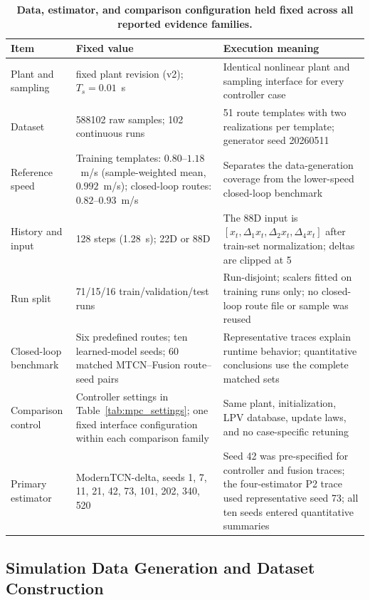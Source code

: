 \documentclass{ieeeaccess}
\begin{document}
\begin{table}[!t]
\centering
\caption{\textbf{Data, estimator, and comparison configuration held fixed across all reported evidence families.}}
\label{tab:frozen_experimental_configuration}
\scriptsize
\setlength{\tabcolsep}{3.4pt}
\setlength{\tabcolsep}{3pt}
\begin{tabular}{|p{}|p{}|p{}|}
\hline
Item & Fixed value & Execution meaning \\
\hline
Plant and sampling & fixed plant revision (v2); $T_s=0.01$~s & Identical nonlinear plant and sampling interface for every controller case \\
Dataset & 588102 raw samples; 102 continuous runs & 51 route templates with two realizations per template; generator seed 20260511 \\
Reference speed & Training templates: \mbox{$0.80$--$1.18$~m/s} (sample-weighted mean, $0.992$~m/s); closed-loop routes: \mbox{$0.82$--$0.93$~m/s} & Separates the data-generation coverage from the lower-speed closed-loop benchmark \\
History and input & 128 steps (1.28~s); 22D or 88D & The 88D input is $[x_t,\Delta_1x_t,\Delta_2x_t,\Delta_4x_t]$ after train-set normalization; deltas are clipped at 5 \\
Run split & 71/15/16 train/validation/test runs & Run-disjoint; scalers fitted on training runs only; no closed-loop route file or sample was reused \\
Closed-loop benchmark & Six predefined routes; ten learned-model seeds; 60 matched MTCN--Fusion route--seed pairs & Representative traces explain runtime behavior; quantitative conclusions use the complete matched sets \\
Comparison control & Controller settings in Table~\ref{tab:mpc_settings}; one fixed interface configuration within each comparison family & Same plant, initialization, LPV database, update laws, and no case-specific retuning \\
Primary estimator & ModernTCN-delta, seeds 1, 7, 11, 21, 42, 73, 101, 202, 340, 520 & Seed 42 was pre-specified for controller and fusion traces; the four-estimator P2 trace used representative seed 73; all ten seeds entered quantitative summaries \\
\hline
\end{tabular}
\end{table}

\subsection{Simulation Data Generation and Dataset Construction}
\end{document}
